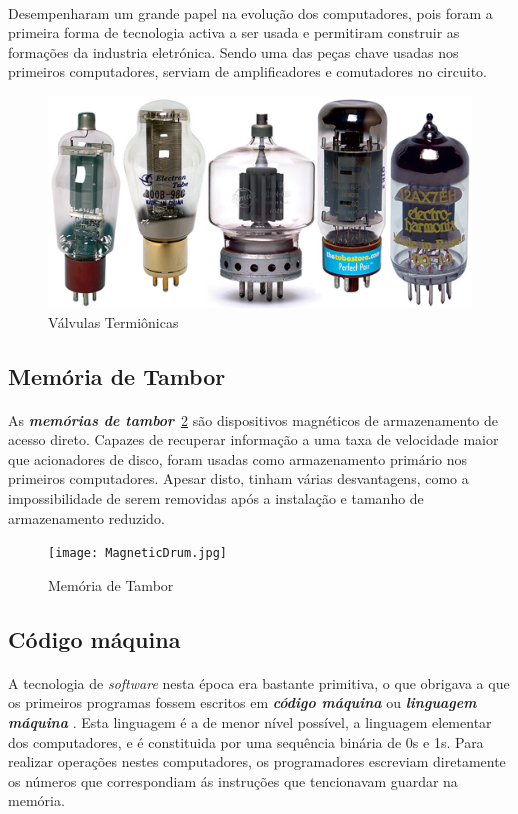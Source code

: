 \documentclass{report}
\begin{document}
\paragraph{}
Desempenharam um grande papel na evolução dos computadores, pois foram a primeira forma de tecnologia activa a ser usada e permitiram construir as formações da industria eletrónica. 
Sendo uma das peças chave usadas nos primeiros computadores, serviam de amplificadores e comutadores no circuito.

\begin{figure}[H]
\centering
\includegraphics[width=0.5\linewidth]{VacuumTubes.jpg}
\caption{Válvulas Termiônicas}
\label{valvula}
\end{figure}

\subsection{Memória de Tambor} 
\label{sec:memoria}
\paragraph{}
As \textbf{\textit{memórias de tambor}}~\ref{tambor} \cite{Memoria} são dispositivos magnéticos de armazenamento de acesso direto. Capazes de recuperar informação a uma taxa de velocidade maior que acionadores de disco, foram usadas como armazenamento primário nos primeiros computadores.
Apesar disto, tinham várias desvantagens, como a impossibilidade de serem removidas após a instalação e tamanho de armazenamento reduzido.

\begin{figure}[H]
\centering
\texttt{[image: MagneticDrum.jpg]}
\caption{Memória de Tambor}
\label{tambor}
\end{figure}

\subsection{Código máquina} 
\label{sec:codigo}
\paragraph{}
A tecnologia de \textit{software} nesta época era bastante primitiva, o que obrigava a que os primeiros programas fossem escritos em \textbf{\textit{código máquina}} ou \textbf{\textit{linguagem máquina}} \cite{CodigoMaquina} .\newline
Esta linguagem é a de menor nível possível, a linguagem elementar dos computadores, e é constituida por uma sequência binária de 0s e 1s. Para realizar operações nestes computadores, os programadores escreviam diretamente os números que correspondiam ás instruções que tencionavam guardar na memória.
\end{document}
